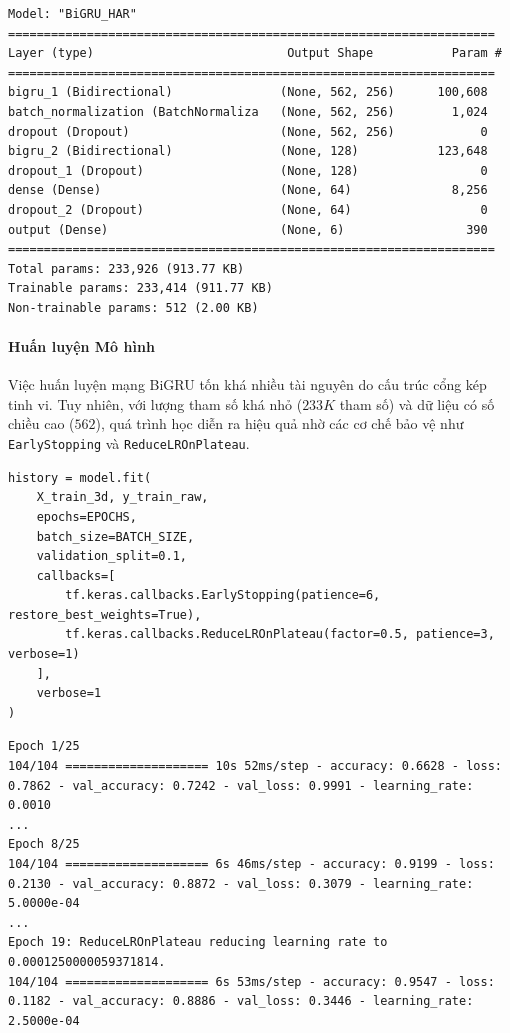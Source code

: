 \begin{lstlisting}[style=consoleoutput, caption={Output: Cấu trúc mô hình BiGRU}]
Model: "BiGRU_HAR"
====================================================================
Layer (type)                           Output Shape           Param #
====================================================================
bigru_1 (Bidirectional)               (None, 562, 256)      100,608
batch_normalization (BatchNormaliza   (None, 562, 256)        1,024
dropout (Dropout)                     (None, 562, 256)            0
bigru_2 (Bidirectional)               (None, 128)           123,648
dropout_1 (Dropout)                   (None, 128)                 0
dense (Dense)                         (None, 64)              8,256
dropout_2 (Dropout)                   (None, 64)                  0
output (Dense)                        (None, 6)                 390
====================================================================
Total params: 233,926 (913.77 KB)
Trainable params: 233,414 (911.77 KB)
Non-trainable params: 512 (2.00 KB)
\end{lstlisting}

\paragraph{Huấn luyện Mô hình} \hfill\mbox{}

Việc huấn luyện mạng BiGRU tốn khá nhiều tài nguyên do cấu trúc cổng kép tinh vi. Tuy nhiên, với lượng tham số khá nhỏ ($233K$ tham số) và dữ liệu có số chiều cao ($562$), quá trình học diễn ra hiệu quả nhờ các cơ chế bảo vệ như \texttt{EarlyStopping} và \texttt{ReduceLROnPlateau}.

\begin{lstlisting}[style=pythoncode, caption={Huấn luyện mạng với các thông số tối ưu}]
history = model.fit(
    X_train_3d, y_train_raw,
    epochs=EPOCHS,
    batch_size=BATCH_SIZE,
    validation_split=0.1,
    callbacks=[
        tf.keras.callbacks.EarlyStopping(patience=6, restore_best_weights=True),
        tf.keras.callbacks.ReduceLROnPlateau(factor=0.5, patience=3, verbose=1)
    ],
    verbose=1
)
\end{lstlisting}

\begin{lstlisting}[style=consoleoutput, caption={Output: Lịch sử Training Log}]
Epoch 1/25
104/104 ==================== 10s 52ms/step - accuracy: 0.6628 - loss: 0.7862 - val_accuracy: 0.7242 - val_loss: 0.9991 - learning_rate: 0.0010
...
Epoch 8/25
104/104 ==================== 6s 46ms/step - accuracy: 0.9199 - loss: 0.2130 - val_accuracy: 0.8872 - val_loss: 0.3079 - learning_rate: 5.0000e-04
...
Epoch 19: ReduceLROnPlateau reducing learning rate to 0.0001250000059371814.
104/104 ==================== 6s 53ms/step - accuracy: 0.9547 - loss: 0.1182 - val_accuracy: 0.8886 - val_loss: 0.3446 - learning_rate: 2.5000e-04
\end{lstlisting}

